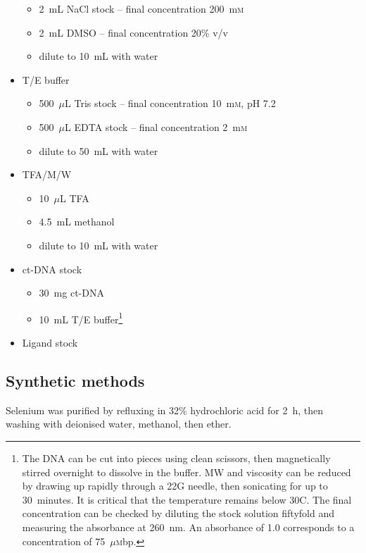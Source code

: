 \begin{refsection}
\begin{itemize}
\begin{itemize}
        \item 2~mL NaCl stock -- final concentration 200~m\textsc{m}
        \item 2~mL DMSO -- final concentration 20\% v/v
        \item dilute to 10~mL with water
    \end{itemize}
    \item T/E buffer
    \begin{itemize}
        \item 500~$\mu$L Tris stock -- final concentration 10~m\textsc{m}, pH 7.2
        \item 500~$\mu$L EDTA stock -- final concentration 2~m\textsc{m}
        \item dilute to 50~mL with water
    \end{itemize}
    \item TFA/M/W
    \begin{itemize}
        \item 10~$\mu$L TFA
        \item 4.5~mL methanol
        \item dilute to 10~mL with water
    \end{itemize}
    \item ct-DNA stock
    \begin{itemize}
        \item 30~mg ct-DNA
        \item 10~mL T/E buffer\footnote{The DNA can be cut into pieces using clean scissors, then magnetically stirred overnight to dissolve in the buffer. MW and viscosity can be reduced by drawing up rapidly through a 22G needle, then sonicating for up to 30~minutes. It is critical that the temperature remains below 30\degree{}C. The final concentration can be checked by diluting the stock solution fiftyfold and measuring the absorbance at 260~nm. An absorbance of 1.0 corresponds to a concentration of 75~$\mu$\textsc{m}bp.}
    \end{itemize}
    \item Ligand stock
\end{itemize}

\subsection{Synthetic methods}

Selenium was purified by refluxing in 32\% hydrochloric acid for 2~h, then washing with deionised water, methanol, then ether.


\end{refsection}
